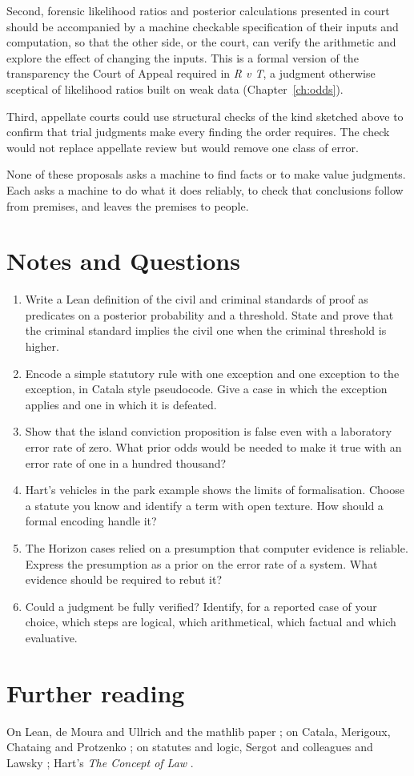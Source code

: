 Second, forensic likelihood ratios and posterior calculations presented in court should be accompanied by a machine checkable specification of their inputs and computation, so that the other side, or the court, can verify the arithmetic and explore the effect of changing the inputs. This is a formal version of the transparency the Court of Appeal required in \emph{R v T}, a judgment otherwise sceptical of likelihood ratios built on weak data (Chapter~\ref{ch:odds}).

Third, appellate courts could use structural checks of the kind sketched above to confirm that trial judgments make every finding the order requires. The check would not replace appellate review but would remove one class of error.

None of these proposals asks a machine to find facts or to make value judgments. Each asks a machine to do what it does reliably, to check that conclusions follow from premises, and leaves the premises to people.

\section*{Notes and Questions}
\begin{enumerate}[label=\arabic*.]
\item Write a Lean definition of the civil and criminal standards of proof as predicates on a posterior probability and a threshold. State and prove that the criminal standard implies the civil one when the criminal threshold is higher.
\item Encode a simple statutory rule with one exception and one exception to the exception, in Catala style pseudocode. Give a case in which the exception applies and one in which it is defeated.
\item Show that the island conviction proposition is false even with a laboratory error rate of zero. What prior odds would be needed to make it true with an error rate of one in a hundred thousand?
\item Hart's vehicles in the park example shows the limits of formalisation. Choose a statute you know and identify a term with open texture. How should a formal encoding handle it?
\item The Horizon cases relied on a presumption that computer evidence is reliable. Express the presumption as a prior on the error rate of a system. What evidence should be required to rebut it?
\item Could a judgment be fully verified? Identify, for a reported case of your choice, which steps are logical, which arithmetical, which factual and which evaluative.
\end{enumerate}

\section*{Further reading}
On Lean, de Moura and Ullrich \citep{demoura2021} and the mathlib paper \citep{mathlib2020}; on Catala, Merigoux, Chataing and Protzenko \citep{merigoux2021}; on statutes and logic, Sergot and colleagues \citep{sergot1986} and Lawsky \citep{lawsky2017}; Hart's \emph{The Concept of Law} \citep{hart1961}.
